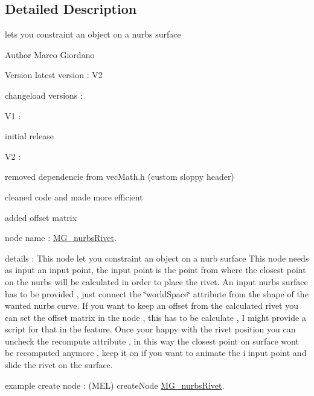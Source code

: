 \subsection{Detailed Description}
lets you constraint an object on a nurbs surface 

\begin{DoxyAuthor}{Author}
Marco Giordano 
\end{DoxyAuthor}
\begin{DoxyVersion}{Version}
latest version \-: V2 

changeload versions \-: \par
 V1 \-: \par

\begin{DoxyItemize}
\item initial release \par
 
\end{DoxyItemize}

V2 \-:
\begin{DoxyItemize}
\item removed dependencie from vec\-Math.\-h (custom sloppy header)
\item cleaned code and made more efficient
\item added offset matrix
\end{DoxyItemize}
\end{DoxyVersion}
node name \-: \hyperlink{class_m_g__nurbs_rivet}{M\-G\-\_\-nurbs\-Rivet}.

details \-: This node let you constraint an object on a nurb surface This node needs as input an input point, the input point is the point from where the closest point on the nurbs will be calculated in order to place the rivet. An input nurbs surface has to be provided , just connect the \char`\"{}world\-Space\char`\"{} attribute from the shape of the wanted nurbs curve. If you want to keep an offset from the calculated rivet you can set the offset matrix in the node , this has to be calculate , I might provide a script for that in the feature. Once your happy with the rivet position you can uncheck the recompute attribute , in this way the closest point on surface wont be recomputed anymore , keep it on if you want to animate the i input point and slide the rivet on the surface.

example create node \-: (M\-E\-L) create\-Node \hyperlink{class_m_g__nurbs_rivet}{M\-G\-\_\-nurbs\-Rivet}. 

